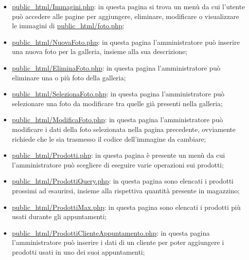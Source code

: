 {\begin{itemize}
		\item \href{http://tecnologie-web.studenti.math.unipd.it/tecweb/~pgabelli/public\_html/Immagini.php}{public\_html/Immagini.php}: in questa pagina si trova un menù da cui l'utente può accedere alle pagine per aggiungere, eliminare, modificare o visualizzare le immagini di \href{http://tecnologie-web.studenti.math.unipd.it/tecweb/~pgabelli/public\_html/foto.php}{public\_html/foto.php};
		\item \href{http://tecnologie-web.studenti.math.unipd.it/tecweb/~pgabelli/public\_html/NuovaFoto.php}{public\_html/NuovaFoto.php}: in questa pagina l'amministratore può inserire una nuova foto per la galleria, insieme alla sua descrizione;
		\item \href{http://tecnologie-web.studenti.math.unipd.it/tecweb/~pgabelli/public\_html/EliminaFoto.php}{public\_html/EliminaFoto.php}: in questa pagina l'amministratore può eliminare una o più foto della galleria;
		\item \href{http://tecnologie-web.studenti.math.unipd.it/tecweb/~pgabelli/public\_html/SelezionaFoto.php}{public\_html/SelezionaFoto.php}: in questa pagina l'amministratore può selezionare una foto da modificare tra quelle già presenti nella galleria;
		\item \href{http://tecnologie-web.studenti.math.unipd.it/tecweb/~pgabelli/public\_html/ModificaFoto.php}{public\_html/ModificaFoto.php}: in questa pagina l'amministratore può modificare i dati della foto selezionata nella pagina precedente, ovviamente richiede che le sia trasmesso il codice dell'immagine da cambiare;
		\item \href{http://tecnologie-web.studenti.math.unipd.it/tecweb/~pgabelli/public\_html/Prodotti.php}{public\_html/Prodotti.php}: in questa pagina è presente un menù da cui l'amministratore può scegliere di eseguire varie operazioni sui prodotti;
		\item \href{http://tecnologie-web.studenti.math.unipd.it/tecweb/~pgabelli/public\_html/ProdottiQuery.php}{public\_html/ProdottiQuery.php}: in questa pagina sono elencati i prodotti prossimi ad esaurirsi, insieme alla rispettiva quantità presente in magazzino;
		\item \href{http://tecnologie-web.studenti.math.unipd.it/tecweb/~pgabelli/public\_html/ProdottiMax.php}{public\_html/ProdottiMax.php}: in questa pagina sono elencati i prodotti più usati durante gli appuntamenti;
		\item \href{http://tecnologie-web.studenti.math.unipd.it/tecweb/~pgabelli/public\_html/ProdottiClienteAppuntamento.php}{public\_html/ProdottiClienteAppuntamento.php}: in questa pagina l'amministratore può inserire i dati di un cliente per poter aggiungere i prodotti usati in uno dei suoi appuntamenti;

\end{itemize}}
